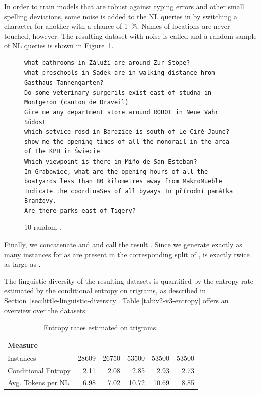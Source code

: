 In order to train models that are robust against typing errors and other small
spelling deviations, some noise is added to the NL queries in
\nlmapsthreea{} by switching a character for another with a chance of
\SI{1}{\%}. Names of locations are never touched, however. The resulting dataset
with noise is called \nlmapsthreeb{} and a random sample of NL queries is
shown in Figure~\ref{fig:nlmaps-v3b-sample}.

\begin{figure}[h]
  \centering
\begin{lstlisting}[style=MyNL]
what bathrooms in Záluží are around Zur Stöpe?
what preschools in Sadek are in walking distance hrom Gasthaus Tannengarten?
Do some veterinary surgerils exist east of studna in Montgeron (canton de Draveil)
Gire me any department store around ROBOT in Neue Vahr Südost
which setvice rosd in Bardzice is south of Le Ciré Jaune?
show me the opening times of all the monorail in the area of The KPH in Świecie
Which viewpoint is there in Miño de San Esteban?
In Grabowiec, what are the opening hours of all the boatyards less than 80 kilometres away from MakroMueble
Indicate the coordinaSes of all byways Tn přírodní památka Branžovy.
Are there parks east of Tigery?
\end{lstlisting}
  \caption[10 random \nlmapsthreeb{}.]{10 random \nlmapsthreeb{}.}
  \label{fig:nlmaps-v3b-sample}
\end{figure}

Finally, we concatenate \nlmapstwo{} and \nlmapsthreeb{} and call the result
\nlmapsthree{}. Since we generate exactly as many instances for
\nlmapsthreeb{} as are present in the corresponding split of \nlmapstwoone{},
\nlmapsthree{} is exactly twice as large as \nlmapstwoone{}.

The linguistic diversity of the resulting datasets is quantified by the entropy
rate estimated by the conditional entropy on trigrams, as described in
Section~\ref{sec:little-linguistic-diversity}. Table \ref{tab:v2-v3-entropy}
offers an overview over the datasets.

\begin{table}[h]
  \centering
  \begin{tabular}{lrrrrr}
    \toprule
    Measure & \nlmtwo{} & \nlmtwoone{} & \nlmthreea{} & \nlmthreeb{} & \nlmthree{}\\
    \midrule
    Instances & \num{28609} & \num{26750} & \num{53500} & \num{53500} & \num{53500}\\
    Conditional Entropy & \num{2.11} & \num{2.08} & \num{2.85} & \num{2.93} & \num{2.73}\\
    Avg. Tokens per NL & \num{6.98} & \num{7.02} & \num{10.72} & \num{10.69} & \num{8.85}\\
    \bottomrule
  \end{tabular}
  \caption{Entropy rates estimated on trigrams.}
  \label{tab:v2-v3-entropy-rates}
\end{table}

